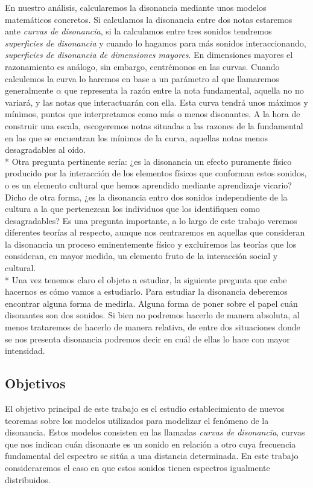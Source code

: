 \documentclass[11pt,a4paper]{article}
\begin{document}
En nuestro análisis, calcularemos la disonancia mediante unos modelos matemáticos concretos. Si calculamos la disonancia entre dos notas estaremos ante \emph{curvas de disonancia}, si la calculamos entre tres sonidos tendremos \emph{superficies de disonancia} y cuando lo hagamos para más sonidos interaccionando, \emph{superficies de disonancia de dimensiones mayores}. En dimensiones mayores el razonamiento es análogo, sin embargo, centrémonos en las curvas. Cuando calculemos la curva lo haremos en base a un parámetro al que llamaremos generalmente $\alpha$ que representa la razón entre la nota fundamental, aquella no no variará, y las notas que interactuarán con ella. Esta curva tendrá unos máximos y mínimos, puntos que interpretamos como más o menos disonantes. A la hora de construir una escala, escogeremos notas situadas a las razones de la fundamental en las que se encuentran los mínimos de la curva, aquellas notas menos desagradables al oído.
\\*
Otra pregunta pertinente sería: ¿es la disonancia un efecto puramente físico producido por la interacción de los elementos físicos que conforman estos sonidos, o es un elemento cultural que hemos aprendido mediante aprendizaje vicario? Dicho de otra forma, ¿es la disonancia entro dos sonidos independiente de la cultura a la que pertenezcan los individuos que los identifiquen como desagradables? Es una pregunta importante, a lo largo de este trabajo veremos diferentes teorías al respecto, aunque nos centraremos en aquellas que consideran la disonancia un proceso eminentemente físico y excluiremos las teorías que los consideran, en mayor medida, un elemento fruto de la interacción social y cultural.
\\*
Una vez tenemos claro el objeto a estudiar, la siguiente pregunta que cabe hacernos es cómo vamos a estudiarlo. Para estudiar la disonancia deberemos encontrar alguna forma de medirla. Alguna forma de poner sobre el papel cuán disonantes son dos sonidos. Si bien no podremos hacerlo de manera absoluta, al menos trataremos de hacerlo de manera relativa, de entre dos situaciones donde se nos presenta disonancia podremos decir en cuál de ellas lo hace con mayor intensidad.

\subsection{Objetivos}

El objetivo principal de este trabajo es el estudio establecimiento de nuevos teoremas sobre los modelos utilizados para modelizar el fenómeno de la disonancia.
Estos modelos consisten en las llamadas \emph{curvas de disonancia}, curvas que nos indican cuán disonante es un sonido en relación a otro cuya frecuencia fundamental del espectro se sitúa a una distancia determinada. En este trabajo consideraremos el caso en que estos sonidos tienen espectros igualmente distribuidos.
\end{document}

